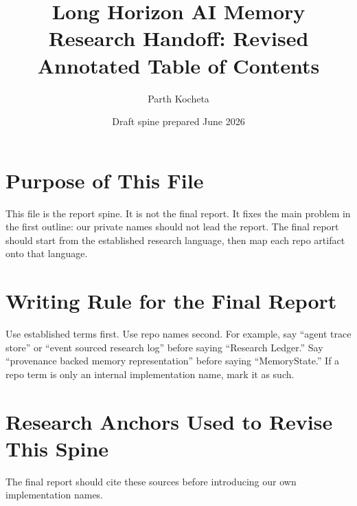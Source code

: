 \documentclass[11pt]{article}
\title{Long Horizon AI Memory Research Handoff: Revised Annotated Table of Contents}
\author{Parth Kocheta}
\date{Draft spine prepared June 2026}
\begin{document}
\maketitle

\section*{Purpose of This File}

This file is the report spine. It is not the final report. It fixes the main problem in the first outline: our private names should not lead the report. The final report should start from the established research language, then map each repo artifact onto that language.

\section*{Writing Rule for the Final Report}

Use established terms first. Use repo names second. For example, say ``agent trace store'' or ``event sourced research log'' before saying ``Research Ledger.'' Say ``provenance backed memory representation'' before saying ``MemoryState.'' If a repo term is only an internal implementation name, mark it as such.

\section*{Research Anchors Used to Revise This Spine}

The final report should cite these sources before introducing our own implementation names.
\end{document}
